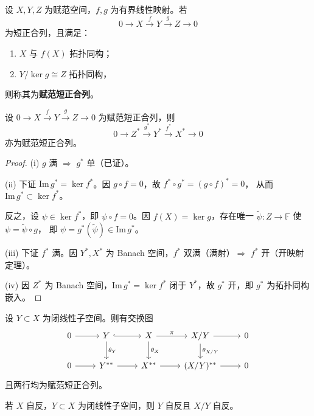 \documentclass[lang=cn,a4paper,newtx,section]{elegantbook}
\begin{document}
\begin{definition}[赋范短正合列]
  设 $X,Y,Z$ 为赋范空间，$f,g$ 为有界线性映射。若
  \[
    0\to X\xrightarrow{f}Y\xrightarrow{g}Z\to 0
  \]
  为短正合列，且满足：
  \begin{enumerate}
    \item $X$ 与 $f(X)$ 拓扑同构；
    \item $Y/\ker g\cong Z$ 拓扑同构，
  \end{enumerate}
  则称其为\textbf{赋范短正合列}。
\end{definition}

\begin{lemma}
  设 $0\to X\xrightarrow{f}Y\xrightarrow{g}Z\to 0$ 为赋范短正合列，则
  \[
    0\to Z^*\xrightarrow{g^*}Y^*\xrightarrow{f^*}X^*\to 0
  \]
  亦为赋范短正合列。
\end{lemma}

\begin{proof}
  (i) $g$ 满 $\Rightarrow$ $g^*$ 单（已证）。

  (ii) 下证 $\mathrm{Im}\,g^*=\ker f^*$。因 $g\circ f=0$，故 $f^*\circ g^*=(g\circ f)^*=0$，
  从而 $\mathrm{Im}\,g^*\subset\ker f^*$。

  反之，设 $\psi\in\ker f^*$，即 $\psi\circ f=0$。因 $f(X)=\ker g$，存在唯一 $\tilde{\psi}:Z\to\mathbb{F}$ 使 $\psi=\tilde{\psi}\circ g$，
  即 $\psi=g^*(\tilde{\psi})\in\mathrm{Im}\,g^*$。

  (iii) 下证 $f^*$ 满。因 $Y^*,X^*$ 为 Banach 空间，$f^*$ 双满（满射）$\Rightarrow$ $f^*$ 开（开映射定理）。

  (iv) 因 $Z^*$ 为 Banach 空间，$\mathrm{Im}\,g^*=\ker f^*$ 闭于 $Y^*$，故 $g^*$ 开，即 $g^*$ 为拓扑同构嵌入。
\end{proof}

\begin{lemma}
  设 $Y\subset X$ 为闭线性子空间。则有交换图
  \[
    \begin{tikzcd}
      0 \arrow[r] & Y \arrow[r,hook] \arrow[d,"\theta_Y"] & X \arrow[r,"\pi"] \arrow[d,"\theta_X"] & X/Y \arrow[r] \arrow[d,"\theta_{X/Y}"] & 0 \\
      0 \arrow[r] & Y^{**} \arrow[r] & X^{**} \arrow[r] & (X/Y)^{**} \arrow[r] & 0
    \end{tikzcd}
  \]
  且两行均为赋范短正合列。
\end{lemma}

\begin{theorem}\label{thm:reflexive-subspace}
  若 $X$ 自反，$Y\subset X$ 为闭线性子空间，则 $Y$ 自反且 $X/Y$ 自反。
\end{theorem}
\end{document}
